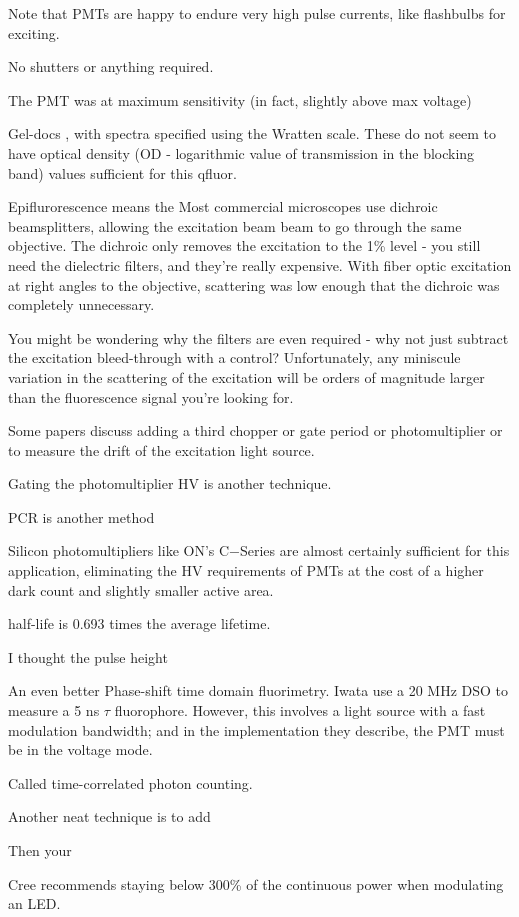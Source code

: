 \documentclass[paper.tex]{subfiles}
\begin{document}
Note that PMTs are happy to endure very high pulse currents, like flashbulbs for exciting. 


No shutters or anything required. 


The PMT was at maximum sensitivity (in fact, slightly above max voltage)

Gel-docs , with spectra specified using the Wratten scale. These do not seem to have optical density (OD - logarithmic value of transmission in the blocking band) values sufficient for this qfluor. 

Epiflurorescence means the Most commercial microscopes use dichroic beamsplitters, allowing the excitation beam beam to go through the same objective. The dichroic only removes the excitation to the 1\% level - you still need the dielectric filters, and they’re really expensive. With fiber optic excitation at right angles to the objective, scattering was low enough that the dichroic was completely unnecessary. 

You might be wondering why the filters are even required - why not just subtract the excitation bleed-through with a control? Unfortunately, any miniscule variation in the scattering of the excitation will be orders of magnitude larger than the fluorescence signal you’re looking for.

Some papers discuss adding a third chopper or gate period or photomultiplier or to measure the drift of the excitation light source.

Gating the photomultiplier HV is another technique.

PCR is another method


Silicon photomultipliers like ON's C−Series are almost certainly sufficient for this application, eliminating the HV requirements of PMTs at the cost of a higher dark count and slightly smaller active area.

half-life is 0.693 times the average lifetime. 


I thought the pulse height

An even better Phase-shift time domain fluorimetry. Iwata use a 20 MHz DSO to measure a 5 ns $\tau$ fluorophore. However, this involves a light source with a fast modulation bandwidth; and in the implementation they describe, the PMT must be in the voltage mode.

Called time-correlated photon counting.

Another neat technique is to add

Then your 

Cree recommends staying below 300\% of the continuous power when modulating an LED.
\end{document}
